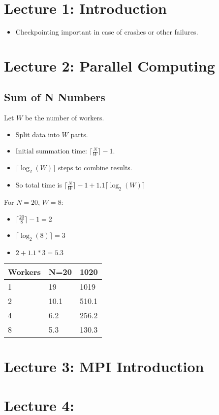 \documentclass[12pt,a4paper]{article}
\begin{document}
\section*{Lecture 1: Introduction}
\begin{itemize}
    \item Checkpointing important in case of crashes or other failures.
\end{itemize}

\section*{Lecture 2: Parallel Computing}
\subsection*{Sum of N Numbers}
Let $W$ be the number of workers. 
\begin{itemize}
    \item Split data into $W$ parts.
    \item Initial summation time: $\lceil \tfrac{N}{W} \rceil - 1$.
    \item $\lceil \log_2(W) \rceil$ steps to combine results.
    \item So total time is $\lceil \tfrac{N}{W} \rceil - 1 + 1.1\lceil \log_2(W) \rceil $
\end{itemize}

For $N=20$, $W=8$:
\begin{itemize}
    \item $\lceil \tfrac{20}{8} \rceil -1 = 2$
    \item $\lceil \log_2(8) \rceil = 3$
    \item $2 + 1.1*3 = 5.3$
\end{itemize}

\begin{table}[!h]
\begin{tabular}{lll}
Workers & N=20 & 1020\\
\hline
1 & 19 & 1019\\
2 & 10.1 & 510.1 \\
4 & 6.2 & 256.2\\
8 & 5.3 & 130.3
\end{tabular}
\end{table}

\section*{Lecture 3: MPI Introduction}

\section*{Lecture 4: }
\end{document}
